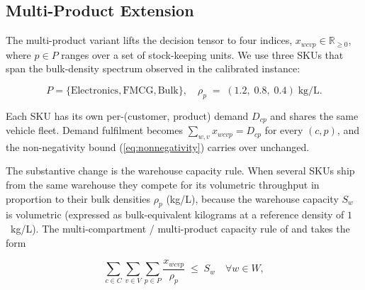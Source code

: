 \documentclass[review,preprint,authoryear,12pt]{elsarticle}
\begin{document}
\subsection{Multi-Product Extension}
\label{sec:formulation:multiproduct}

The multi-product variant lifts the decision tensor to four indices,
$x_{wcvp} \in \mathbb{R}_{\geq 0}$, where $p \in P$ ranges over a set
of stock-keeping units. We use three SKUs that span the bulk-density
spectrum observed in the calibrated instance:

\begin{equation*}
P = \{\text{Electronics}, \text{FMCG}, \text{Bulk}\},
\quad
\rho_p \;=\; (1.2,\; 0.8,\; 0.4) \;\text{kg/L}.
\end{equation*}

Each SKU has its own per-(customer, product) demand $D_{cp}$ and
shares the same vehicle fleet. Demand fulfilment becomes
$\sum_{w, v} x_{wcvp} = D_{cp}$ for every $(c, p)$, and the
non-negativity bound (\ref{eq:nonnegativity}) carries over unchanged.

The substantive change is the warehouse capacity rule. When several
SKUs ship from the same warehouse they compete for its volumetric
throughput in proportion to their bulk densities $\rho_p$ (kg/L),
because the warehouse capacity $S_w$ is volumetric (expressed as
bulk-equivalent kilograms at a reference density of $1$~kg/L). The
multi-compartment / multi-product capacity rule of
\citet{salhi1999cluster} and
\citet[\S2.1]{coelho2015multicompartment} takes the form

\begin{equation}
\sum_{c \in C} \sum_{v \in V} \sum_{p \in P}
\frac{x_{wcvp}}{\rho_p} \;\leq\; S_w
\quad \forall w \in W,
\label{eq:density-weighted-capacity}
\end{equation}
\end{document}
